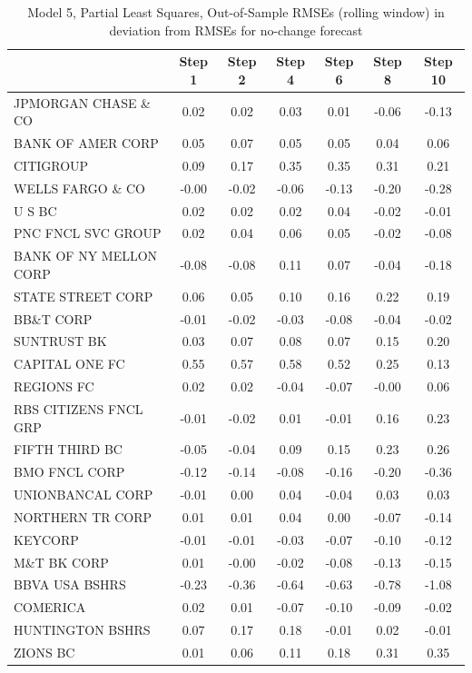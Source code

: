 \documentclass[11pt]{article}
\begin{document}
\begin{table}  
\caption{Model 5, Partial Least Squares, Out-of-Sample RMSEs (rolling window) in deviation from RMSEs for no-change forecast}                                                                 
\center                                                     
\begin{tabular}{|l|c|c|c|c|c|c|}                            
\hline                                                      
&Step 1 &Step 2 &Step 4 &Step 6 &Step 8 &Step 10\\          
\hline                                                      
JPMORGAN CHASE \& CO  &0.02&0.02&0.03&0.01&-0.06&-0.13\\    
BANK OF AMER CORP     &0.05&0.07&0.05&0.05&0.04&0.06\\      
CITIGROUP             &0.09&0.17&0.35&0.35&0.31&0.21\\      
WELLS FARGO \& CO     &-0.00&-0.02&-0.06&-0.13&-0.20&-0.28\\
U S BC                &0.02&0.02&0.02&0.04&-0.02&-0.01\\    
PNC FNCL SVC GROUP    &0.02&0.04&0.06&0.05&-0.02&-0.08\\    
BANK OF NY MELLON CORP&-0.08&-0.08&0.11&0.07&-0.04&-0.18\\  
STATE STREET CORP     &0.06&0.05&0.10&0.16&0.22&0.19\\      
BB\&T CORP            &-0.01&-0.02&-0.03&-0.08&-0.04&-0.02\\
SUNTRUST BK           &0.03&0.07&0.08&0.07&0.15&0.20\\      
CAPITAL ONE FC        &0.55&0.57&0.58&0.52&0.25&0.13\\      
REGIONS FC            &0.02&0.02&-0.04&-0.07&-0.00&0.06\\   
RBS CITIZENS FNCL GRP &-0.01&-0.02&0.01&-0.01&0.16&0.23\\   
FIFTH THIRD BC        &-0.05&-0.04&0.09&0.15&0.23&0.26\\    
BMO FNCL CORP         &-0.12&-0.14&-0.08&-0.16&-0.20&-0.36\\
UNIONBANCAL CORP      &-0.01&0.00&0.04&-0.04&0.03&0.03\\    
NORTHERN TR CORP      &0.01&0.01&0.04&0.00&-0.07&-0.14\\    
KEYCORP               &-0.01&-0.01&-0.03&-0.07&-0.10&-0.12\\
M\&T BK CORP          &0.01&-0.00&-0.02&-0.08&-0.13&-0.15\\ 
BBVA USA BSHRS        &-0.23&-0.36&-0.64&-0.63&-0.78&-1.08\\
COMERICA              &0.02&0.01&-0.07&-0.10&-0.09&-0.02\\  
HUNTINGTON BSHRS      &0.07&0.17&0.18&-0.01&0.02&-0.01\\    
ZIONS BC              &0.01&0.06&0.11&0.18&0.31&0.35\\      
\hline                                                      
\end{tabular}                                               
\end{table}                                                 
\end{document}
